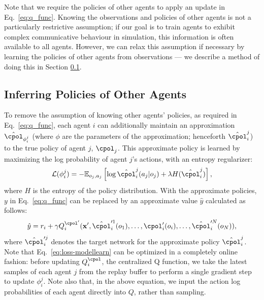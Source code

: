 Note that we require the policies of other agents to apply an update in Eq.~\ref{eq:q_func}. Knowing the observations and policies of other agents is not a particularly restrictive assumption; if our goal is to train agents to exhibit complex communicative behaviour in simulation, this information is often available to all agents.
However, we can relax this assumption if necessary by learning the policies of other agents from observations --- we describe a method of doing this in Section \ref{sec:modellearning}.


\subsection{Inferring Policies of Other Agents}
\label{sec:modellearning}
To remove the assumption of knowing other agents' policies, as required in Eq.~\ref{eq:q_func}, each agent $i$ can additionally maintain an approximation $\hat{\cpol}_{\phi_i^j}$ (where $\phi$ are the parameters of the approximation; henceforth $\hat{\cpol}_i^j$) to the true policy of agent $j$, $\cpol_j$. This approximate policy is learned by maximizing the log probability of agent $j$'s actions, with an entropy regularizer:
\begin{equation}\label{eq:loss-modellearn}
\mathcal{L}(\phi_i^j)=-\mathbb{E}_{o_j,a_j}\left[\log \hat{\cpol}_i^j(a_j|o_j) + \lambda H(\hat{\cpol}_i^j) \right],
\end{equation}
where $H$ is the entropy of the policy distribution. With the approximate policies, $y$ in Eq.~\ref{eq:q_func} can be replaced by an approximate value $\hat{y}$ calculated as follows: 
\begin{equation}\label{eq:approx_q_func}
\hat{y} = r_i + \gamma Q^{\cpol'}_i(\mathbf{x}', \hat{\cpol}'^1_i(o_1),\ldots,\cpol'_i(o_i),\ldots,\hat{\cpol}'^N_i(o_N)),
\end{equation}
where $\hat{\cpol}'^j_i$ denotes the target network for the approximate policy $\hat{\cpol}_i^j$.
Note that Eq.~\ref{eq:loss-modellearn} can be optimized in a completely online fashion: before updating  $Q^{\cpol}_i$, the centralized Q function, we take the latest samples of each agent $j$ from the replay buffer to perform a single gradient step to update $\phi_i^j$. %
Note also that, in the above equation, we input the action log probabilities of each agent directly into $Q$, rather than sampling.

